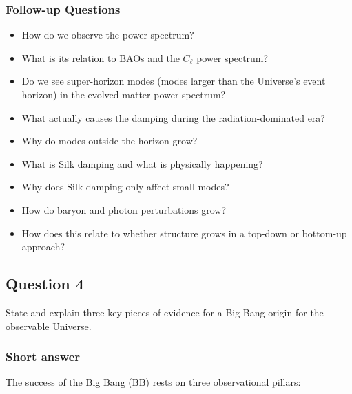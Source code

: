 \documentclass[a4paper,11pt]{article}
\begin{document}
\subsubsection{Follow-up Questions}

\begin{itemize}
    \item How do we observe the power spectrum?
    \item What is its relation to BAOs and the $C_\ell$ power spectrum?
    \item Do we see super-horizon modes (modes larger than the Universe's event horizon) in the evolved matter power spectrum?
    \item What actually causes the damping during the radiation-dominated era?
    \item Why do modes outside the horizon grow?
    \item What is Silk damping and what is physically happening?
    \item Why does Silk damping only affect small modes?
    \item How do baryon and photon perturbations grow?
    \item How does this relate to whether structure grows in a top-down or bottom-up approach?
\end{itemize}

%
%

\newpage
\subsection{Question 4}

State and explain three key pieces of evidence for a Big Bang origin for the observable Universe.

\subsubsection{Short answer}

The success of the Big Bang (BB) rests on three observational pillars:
\end{document}
